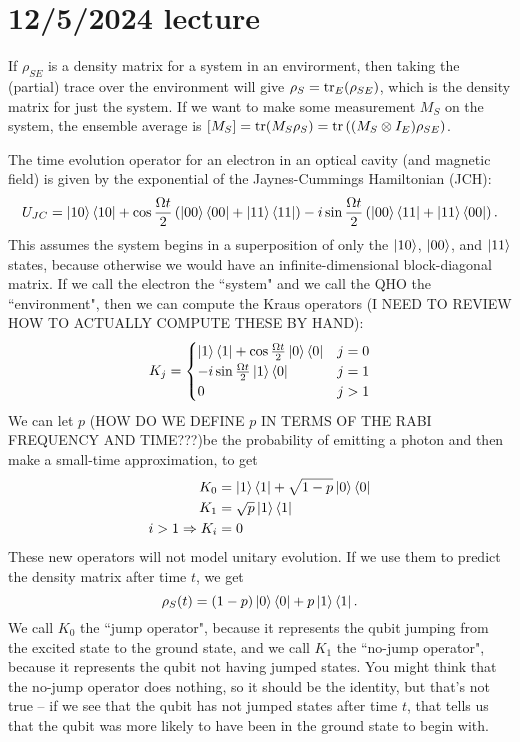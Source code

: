 \documentclass{article}
\begin{document}
\section{12/5/2024 lecture}
If $\rho_{SE}$ is a density matrix for a system in an envirorment, then taking the (partial) trace over the environment will give $\rho_S = \operatorname{tr}_E(\rho_{SE})$, which is the density matrix for just the system. If we want to make some measurement $M_S$ on the system, the ensemble average is $[M_S] =\operatorname{tr} (M_S \rho_S) = \operatorname{tr} \left( (M_S \otimes I_E) \rho_{SE} \right)$.
\par
The time evolution operator for an electron in an optical cavity (and magnetic field) is given by the exponential of the Jaynes-Cummings Hamiltonian (JCH):
\[ U_{JC} = \left\lvert 10 \right\rangle\left\langle 10 \right\rvert + \cos \frac{\Omega t}{2} \left( \left\lvert 00 \right\rangle\left\langle 00 \right\rvert + \left\lvert 11 \right\rangle\left\langle 11 \right\rvert \right) - i\sin \frac{\Omega t}{2} \left( \left\lvert 00 \right\rangle\left\langle 11 \right\rvert + \left\lvert 11 \right\rangle\left\langle 00 \right\rvert \right). \]
This assumes the system begins in a superposition of only the $\left\lvert 10 \right\rangle$, $\left\lvert 00 \right\rangle$, and $\left\lvert 11 \right\rangle$ states, because otherwise we would have an infinite-dimensional block-diagonal matrix. If we call the electron the ``system" and we call the QHO the ``environment", then we can compute the Kraus operators (I NEED TO REVIEW HOW TO ACTUALLY COMPUTE THESE BY HAND):
\[ K_j = \begin{cases}
    \left\lvert 1 \right\rangle\left\langle 1 \right\rvert + \cos \frac{\Omega t}{2} \left\lvert 0 \right\rangle\left\langle 0 \right\rvert & j = 0 \\
    -i \sin \frac{\Omega t}{2} \left\lvert 1 \right\rangle\left\langle 0 \right\rvert & j = 1 \\
    0 & j > 1
\end{cases} \]
We can let $p$ (HOW DO WE DEFINE $p$ IN TERMS OF THE RABI FREQUENCY AND TIME???)be the probability of emitting a photon and then make a small-time approximation, to get
\begin{align*}
    K_0 &= \left\lvert 1 \right\rangle\left\langle 1 \right\rvert + \sqrt{1-p} \left\lvert 0 \right\rangle\left\langle 0 \right\rvert \\
    K_1 &= \sqrt{p} \left\lvert 1 \right\rangle\left\langle 1 \right\rvert \\
    i > 1 \Rightarrow K_i &=0
\end{align*}
These new operators will not model unitary evolution. If we use them to predict the density matrix after time $t$, we get
\[ \rho_S(t) = (1-p) \left\lvert 0 \right\rangle\left\langle 0 \right\rvert + p \left\lvert 1 \right\rangle\left\langle 1 \right\rvert. \]
We call $K_0$ the ``jump operator", because it represents the qubit jumping from the excited state to the ground state, and we call $K_1$ the ``no-jump operator", because it represents the qubit not having jumped states. You might think that the no-jump operator does nothing, so it should be the identity, but that's not true -- if we see that the qubit has not jumped states after time $t$, that tells us that the qubit was more likely to have been in the ground state to begin with.
\end{document}
